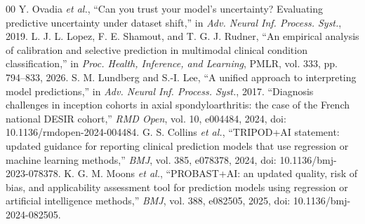 \documentclass[conference]{IEEEtran}
\begin{document}
\begin{thebibliography}{00}
 Y. Ovadia \emph{et al.}, ``Can you trust your model's uncertainty? Evaluating predictive uncertainty under dataset shift,'' in \emph{Adv. Neural Inf. Process. Syst.}, 2019.
 L. J. L. Lopez, F. E. Shamout, and T. G. J. Rudner, ``An empirical analysis of calibration and selective prediction in multimodal clinical condition classification,'' in \emph{Proc. Health, Inference, and Learning}, PMLR, vol. 333, pp. 794--833, 2026.
 S. M. Lundberg and S.-I. Lee, ``A unified approach to interpreting model predictions,'' in \emph{Adv. Neural Inf. Process. Syst.}, 2017.
 ``Diagnosis challenges in inception cohorts in axial spondyloarthritis: the case of the French national DESIR cohort,'' \emph{RMD Open}, vol. 10, e004484, 2024, doi: 10.1136/rmdopen-2024-004484.
 G. S. Collins \emph{et al.}, ``TRIPOD+AI statement: updated guidance for reporting clinical prediction models that use regression or machine learning methods,'' \emph{BMJ}, vol. 385, e078378, 2024, doi: 10.1136/bmj-2023-078378.
 K. G. M. Moons \emph{et al.}, ``PROBAST+AI: an updated quality, risk of bias, and applicability assessment tool for prediction models using regression or artificial intelligence methods,'' \emph{BMJ}, vol. 388, e082505, 2025, doi: 10.1136/bmj-2024-082505.
\end{thebibliography}
\end{document}
